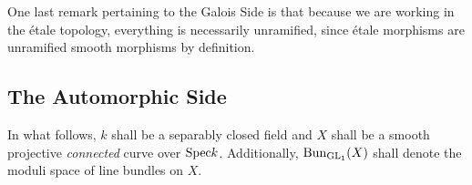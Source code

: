         One last remark pertaining to the Galois Side is that because we are working in the \'etale topology, everything is necessarily unramified, since \'etale morphisms are unramified smooth morphisms by definition.
    
    \subsection{The Automorphic Side}
        \begin{convention}
            In what follows, $k$ shall be a separably closed field and $X$ shall be a smooth projective \textit{connected} curve over $\mathrm{Spec} k$. Additionally, $\mathrm{Bun}_{\operatorname{GL}_1}(X)$ shall denote the moduli space of line bundles on $X$.
        \end{convention}
    
